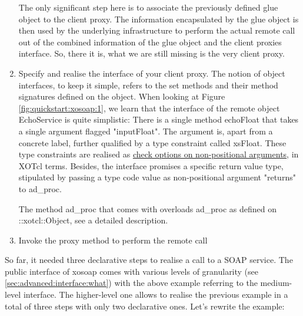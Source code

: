 \begin{enumerate}
  The only significant step here is to associate the previously
  defined glue object to the client proxy. The information encapsulated
  by the glue object is then used by the underlying infrastructure to
  perform the actual remote call out of the combined information of the
  glue object and the client proxies interface. So, there it is, what we
  are still missing is the very client proxy.
\item Specify and realise the interface of your client proxy. The
  notion of object interfaces, to keep it simple, refers to the set
  methods and their method signatures defined on the object. When
  looking at Figure \ref{fig:quickstart:xosoap:1}, we learn that the
  interface of the remote object EchoService is quite simplistic: There
  is a single method echoFloat that takes a single argument flagged
  "inputFloat". The argument is, apart from a concrete label, further
  qualified by a type constraint called xsFloat. These type constraints
  are realised as
  \href{http://media.wu-wien.ac.at/doc/tutorial.html#non-pos-args}{check
    options on non-positional arguments}, in XOTcl terms. Besides, the
  interface promises a specific return value type, stipulated by passing
  a type code value as non-positional argument "returns" to ad\_proc.
  
  
  The method ad\_proc that comes with 
  overloads ad\_proc as defined on ::xotcl::Object, see
   a detailed
  description.
\item Invoke the proxy method to perform the remote call
%
  
\end{enumerate}
So far, it needed three declarative steps to realise a call to a SOAP
service. The public interface of xosoap comes with various levels of
granularity (see \ref{sec:advanced:interface:what}) with the above
example referring to the medium-level interface. The higher-level one
allows to realise the previous example in a total of three steps with
only two declarative ones. Let's rewrite the example:

